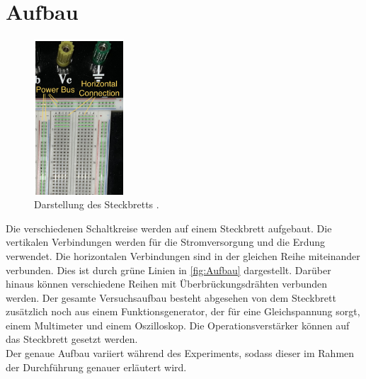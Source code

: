 \section{Aufbau}
\label{sec:Aufbau}

\begin{figure}
    \begin{center}
        \includegraphics[width=0.3\textwidth]{Aufbau.png}
        \caption{Darstellung des Steckbretts \cite{ap51}.}
        \label{fig:Aufbau}
    \end{center} 
    \end{figure}
Die verschiedenen Schaltkreise werden auf einem Steckbrett aufgebaut. 
Die vertikalen Verbindungen werden für die Stromversorgung und die Erdung verwendet. Die horizontalen Verbindungen 
sind in der gleichen Reihe miteinander verbunden. Dies ist durch grüne Linien in \autoref{fig:Aufbau} dargestellt.
Darüber hinaus können verschiedene Reihen mit Überbrückungsdrähten verbunden werden. 
Der gesamte Versuchsaufbau besteht abgesehen von dem Steckbrett zusätzlich noch aus einem Funktionsgenerator, der für eine Gleichspannung sorgt, 
einem Multimeter und einem Oszilloskop. Die Operationsverstärker können auf das Steckbrett gesetzt werden.
\\
Der genaue Aufbau variiert während des Experiments, sodass dieser im Rahmen der Durchführung genauer erläutert wird.
